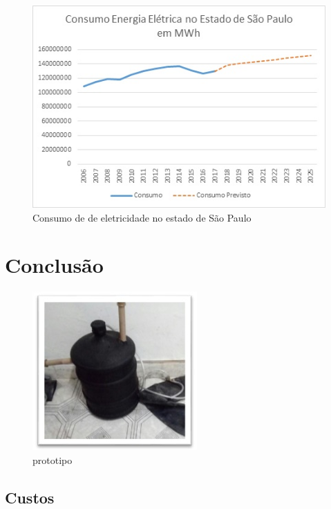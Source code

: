 \documentclass[
	12pt,		%
	oneside,
	a4paper,
	chapter=TITLE,
	english,
	brazil,
	hidelinks
]{abntex2}
\begin{document}
\begin{figure}[htb]
	\caption{\label{fig_graficoy}Consumo de de eletricidade no estado de São Paulo}
	\begin{center}
	    \includegraphics[scale=1.0]{consumo_eletricidade_sp.jpg}
	\end{center}
\end{figure}

\chapter{Conclusão}

\blindtext

\begin{figure}[htb]
	\caption{\label{fig_graficox}prototipo}
	\begin{center}
	    \includegraphics[scale=1.0]{prototipo.jpg}
	\end{center}
\end{figure}

\section{Custos}

\Blindtext

\postextual


\end{document}
